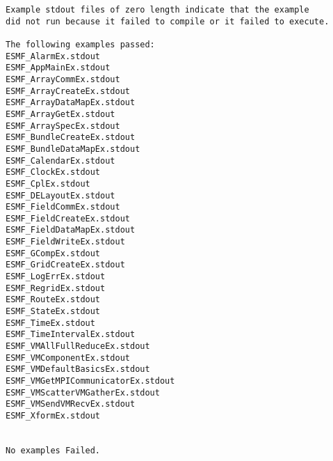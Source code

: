 \begin{verbatim}
Example stdout files of zero length indicate that the example
did not run because it failed to compile or it failed to execute. 

The following examples passed: 
ESMF_AlarmEx.stdout
ESMF_AppMainEx.stdout
ESMF_ArrayCommEx.stdout
ESMF_ArrayCreateEx.stdout
ESMF_ArrayDataMapEx.stdout
ESMF_ArrayGetEx.stdout
ESMF_ArraySpecEx.stdout
ESMF_BundleCreateEx.stdout
ESMF_BundleDataMapEx.stdout
ESMF_CalendarEx.stdout
ESMF_ClockEx.stdout
ESMF_CplEx.stdout
ESMF_DELayoutEx.stdout
ESMF_FieldCommEx.stdout
ESMF_FieldCreateEx.stdout
ESMF_FieldDataMapEx.stdout
ESMF_FieldWriteEx.stdout
ESMF_GCompEx.stdout
ESMF_GridCreateEx.stdout
ESMF_LogErrEx.stdout
ESMF_RegridEx.stdout
ESMF_RouteEx.stdout
ESMF_StateEx.stdout
ESMF_TimeEx.stdout
ESMF_TimeIntervalEx.stdout
ESMF_VMAllFullReduceEx.stdout
ESMF_VMComponentEx.stdout
ESMF_VMDefaultBasicsEx.stdout
ESMF_VMGetMPICommunicatorEx.stdout
ESMF_VMScatterVMGatherEx.stdout
ESMF_VMSendVMRecvEx.stdout
ESMF_XformEx.stdout


No examples Failed.


\end{verbatim}
